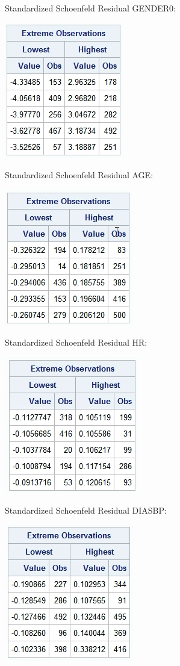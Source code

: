 \documentclass{elegantbook}
\begin{document}
\begin{solution}
\begin{enumerate}
\begin{enumerate}[(a)]
\begin{center}
            \end{center}
            Standardized Schoenfeld Residual GENDER0: \begin{center}
                \includegraphics[width=.3\textwidth]{gender0.png}
            \end{center}
            Standardized Schoenfeld Residual AGE: \begin{center}
                \includegraphics[width=.3\textwidth]{age.png}
            \end{center}
            Standardized Schoenfeld Residual HR: \begin{center}
                \includegraphics[width=.3\textwidth]{hr.png}
            \end{center}
            Standardized Schoenfeld Residual DIASBP: \begin{center}
                \includegraphics[width=.3\textwidth]{diasbp.png}

\end{center}
\end{enumerate}
\end{enumerate}
\end{solution}
\end{document}
